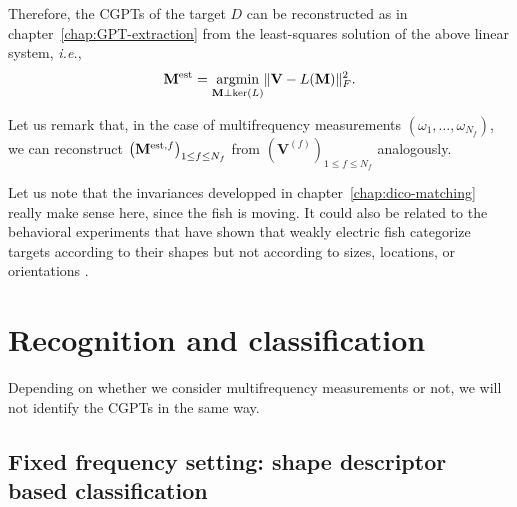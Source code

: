 Therefore,  the CGPTs of the target $D$ can be reconstructed as
in chapter~\ref{chap:GPT-extraction} from 
the least-squares solution of the above linear system, {\it i.e.},
\begin{equation}
\mathbf{M}^{\mathrm{est}} = \underset{\mathbf{M} \perp \mathrm{ker }
(L)}{\mbox{argmin}} \| \mathbf{V} -
L(\mathbf{M}) \|^2_{F}. \label{eq:lsqr}
\end{equation}


Let us remark that, in the case of multifrequency measurements
$(\omega_{1},\ldots,\omega_{N_f})$, we can reconstruct
$\left(\mathbf{M}^{\mathrm{est},f}\right)_{1\leq f\leq N_f}$ from
$\left(\mathbf{V}^{(f)}\right)_{1\leq f\leq N_f}$ analogously.


Let us note that the invariances
developped in chapter~\ref{chap:dico-matching} really make sense here,
since the fish is moving. It could also be related to the behavioral
experiments that have shown that weakly electric fish categorize
targets according to their shapes but not according to  sizes,
locations, or orientations \cite{gerhard}.



\section{Recognition and classification}

\label{sub:identification-algo}

Depending on whether we consider multifrequency measurements or
not, we will not identify the CGPTs in the same way.


\subsection{Fixed frequency setting: shape descriptor based classification}

% 

